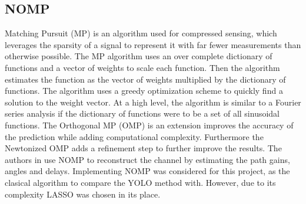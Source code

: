 \subsection{NOMP}
Matching Pursuit (MP) is an algorithm used for compressed sensing, which leverages the sparsity of a signal to represent it with far fewer measurements than otherwise possible. The MP algorithm uses an over complete dictionary of functions and a vector of weights to scale each function. Then the algorithm estimates the function as the vector of weights multiplied by the dictionary of functions. The algorithm uses a greedy optimization scheme to quickly find a solution to the weight vector. At a high level, the algorithm is similar to a Fourier series analysis if the dictionary of functions were to be a set of all sinusoidal functions. The Orthogonal MP (OMP) is an extension improves the accuracy of the prediction while adding computational complexity. Furthermore the Newtonized OMP adds a refinement step to further improve the results. The authors in \cite{Han2019} use NOMP to reconstruct the channel by estimating the path gains, angles and delays. Implementing NOMP was considered for this project, as the clasical algorithm to compare the YOLO method with. However, due to its complexity LASSO was chosen in its place.


